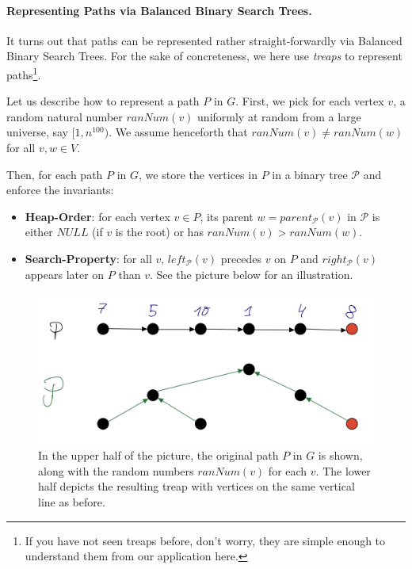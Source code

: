 \paragraph{Representing Paths via Balanced Binary Search Trees.} It turns out that paths can be represented rather straight-forwardly via Balanced Binary Search Trees. For the sake of concreteness, we here use \emph{treaps} to represent paths\footnote{If you have not seen treaps before, don't worry, they are simple enough to understand them from our application here. }. 

Let us describe how to represent a path $P$ in $G$. First, we pick for each vertex $v$, a random natural number $ranNum(v)$ uniformly at random from a large universe, say $[1, n^{100})$. We assume henceforth that $ranNum(v) \neq ranNum(w)$ for all $v,w\in V$.

Then, for each path $P$ in $G$, we store the vertices in $P$ in a binary tree $\mathcal{P}$ and enforce the invariants:
\begin{itemize}
    \item \textbf{Heap-Order}: for each vertex $v \in P$, its parent $w = parent_{\mathcal{P}}(v)$ in $\mathcal{P}$ is either $NULL$ (if $v$ is the root) or has $ranNum(v) > ranNum(w)$.
    \item \textbf{Search-Property}: for all $v$, $left_{\mathcal{P}}(v)$ precedes $v$ on $P$ and $right_{\mathcal{P}}(v)$ appears later on $P$ than $v$. See the picture below for an illustration.
\end{itemize}

\begin{figure}[!ht]
    \centering
    \includegraphics[scale=0.2]{./fig/PathRepTreap_lectureDynamicTree.jpeg}
    \caption{In the upper half of the picture, the original path $P$ in $G$ is shown, along with the random numbers $ranNum(v)$ for each $v$. The lower half depicts the resulting treap with vertices on the same vertical line as before.}
    \label{fig:my_label}
\end{figure}

